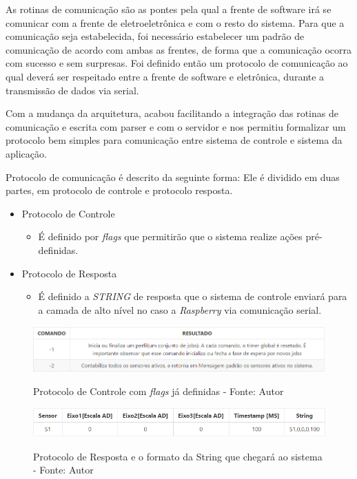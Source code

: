 As rotinas de comunicação são as pontes pela qual a frente de software irá se comunicar com a frente de eletroeletrônica e com o resto do sistema. Para que a comunicação seja estabelecida, foi necessário estabelecer um padrão de comunicação de acordo com ambas as frentes, de forma que a comunicação ocorra com sucesso e sem surpresas. Foi definido então um protocolo de comunicação ao qual deverá ser respeitado entre a frente de software e eletrônica, durante a transmissão de dados via serial.

Com a mudança da arquitetura, acabou facilitando a integração das rotinas de comunicação e escrita com parser e com o servidor e nos permitiu formalizar um protocolo bem simples para comunicação entre sistema de controle e sistema da aplicação.

Protocolo de comunicação é descrito da seguinte forma: Ele é dividido em duas partes, em protocolo de controle e protocolo resposta.

\begin{itemize}
    \item Protocolo de Controle
    \begin{itemize}
        \item É definido por \textit{flags} que permitirão que o sistema realize ações pré-definidas.
    \end{itemize}
    \item Protocolo de Resposta
    \begin{itemize}
        \item É definido a \textit{STRING} de resposta que o sistema de controle enviará para a camada de alto nível no caso a \textit{Raspberry} via comunicação serial.
    \end{itemize}
\end{itemize}

\begin{figure}[H]
\centering
\includegraphics[keepaspectratio=true,scale=0.7]{figuras/protocolo_controle.png}
\label{fig:protocolo_controle}
\caption{Protocolo de Controle com \textit{flags} já definidas - Fonte: Autor}
\end{figure}

\begin{figure}[H]
\centering
\includegraphics[keepaspectratio=true,scale=0.8]{figuras/protocolo_string.png}
\label{fig:protocolo_string}
\caption{Protocolo de Resposta e o formato da String que chegará ao sistema - Fonte: Autor}
\end{figure}

